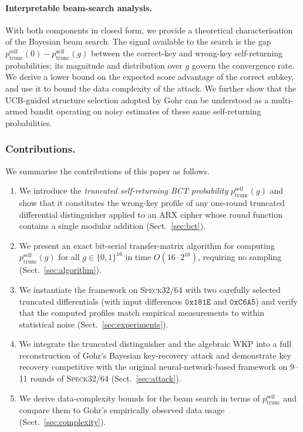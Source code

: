 \documentclass[runningheads]{llncs}
\newcommand{\pself}{p^{\mathrm{self}}_{\mathrm{trunc}}}
\newcommand{\speck}{\textsc{Speck}32/64}
\begin{document}
\paragraph{Interpretable beam-search analysis.}
With both components in closed form, we provide a theoretical
characterisation of the Bayesian beam search.  The signal available to
the search is the gap $\pself(0) - \pself(g)$ between the correct-key
and wrong-key self-returning probabilities; its magnitude and
distribution over $g$ govern the convergence rate.  We derive a
lower bound on the expected score advantage of the correct subkey, and
use it to bound the data complexity of the attack.  We further show
that the UCB-guided structure selection adopted by Gohr can be
understood as a multi-armed bandit operating on noisy estimates of
these same self-returning probabilities.

\subsubsection{Contributions.}
We summarise the contributions of this paper as follows.
\begin{enumerate}
  \item We introduce the \emph{truncated self-returning BCT
    probability} $\pself(g)$ and show that it constitutes the
    wrong-key profile of any one-round truncated differential
    distinguisher applied to an ARX cipher whose round function
    contains a single modular addition (Sect.~\ref{sec:bct}).

  \item We present an exact bit-serial transfer-matrix algorithm for
    computing $\pself(g)$ for all $g \in \{0,1\}^{16}$ in time
    $O(16 \cdot 2^{16})$, requiring no sampling
    (Sect.~\ref{sec:algorithm}).

  \item We instantiate the framework on \speck{} with two carefully
    selected truncated differentials (with input differences
    $\mathtt{0x181E}$ and $\mathtt{0xC6A5}$) and verify that the
    computed profiles match empirical measurements to within
    statistical noise (Sect.~\ref{sec:experiments}).

  \item We integrate the truncated distinguisher and the algebraic WKP
    into a full reconstruction of Gohr's Bayesian key-recovery attack
    and demonstrate key recovery competitive with the original
    neural-network-based framework on 9--11 rounds of \speck{}
    (Sect.~\ref{sec:attack}).

  \item We derive data-complexity bounds for the beam search in terms
    of $\pself$ and compare them to Gohr's empirically observed data
    usage (Sect.~\ref{sec:complexity}).
\end{enumerate}
\end{document}

